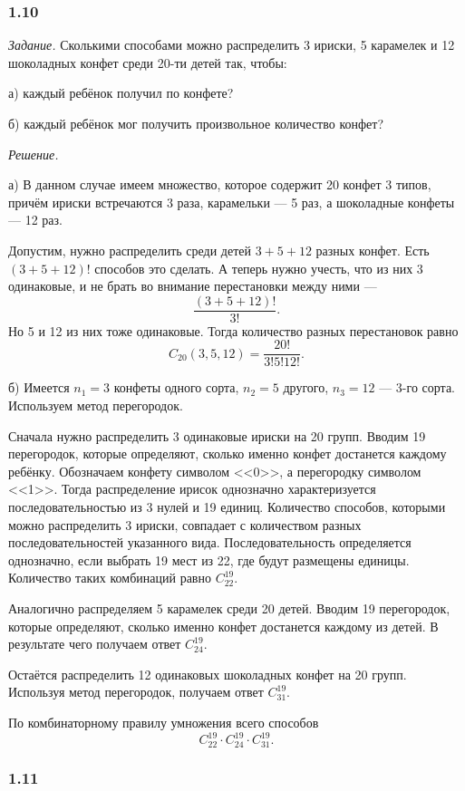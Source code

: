 \documentclass{book}
\begin{document}
\subsubsection*{1.10}

\textit{Задание.} Сколькими способами можно распределить 3 ириски, 5 карамелек и 12 шоколадных конфет среди 20-ти детей так, чтобы:

а) каждый ребёнок получил по конфете?

б) каждый ребёнок мог получить произвольное количество конфет?

\textit{Решение.}

а) В данном случае имеем множество, которое содержит 20 конфет 3 типов, причём ириски встречаются 3 раза, карамельки --- 5 раз, а шоколадные конфеты --- 12 раз.

Допустим, нужно распределить среди детей $3+5+12$ разных конфет. Есть $\left(3+5+12\right)!$ способов это сделать. А теперь нужно учесть, что из них 3 одинаковые, и не брать во внимание перестановки между ними --- $$\frac{\left(3+5+12\right)!}{3!}.$$ Но 5 и 12 из них тоже одинаковые. Тогда количество разных перестановок равно $$C_{20}\left(3, 5, 12\right)=\frac{20!}{3!5!12!}.$$

б) Имеется $n_1=3$ конфеты одного сорта, $n_2=5$ другого, $n_3=12$ --- 3-го сорта. Используем метод перегородок. 

Сначала нужно распределить 3 одинаковые ириски на 20 групп. Вводим 19 перегородок, которые определяют, сколько именно конфет достанется каждому ребёнку. Обозначаем конфету символом <<0>>, а перегородку символом <<1>>. Тогда распределение ирисок однозначно характеризуется последовательностью из 3 нулей и 19 единиц. Количество способов, которыми можно распределить 3 ириски, совпадает с количеством разных последовательностей указанного вида. Последовательность определяется однозначно, если выбрать 19 мест из 22, где будут размещены единицы. Количество таких комбинаций равно $C_{22}^{19}$.

Аналогично распределяем 5 карамелек среди 20 детей. Вводим 19 перегородок, которые определяют, сколько именно конфет достанется каждому из детей. В результате чего получаем ответ $C_{24}^{19}$.

Остаётся распределить 12 одинаковых шоколадных конфет на 20 групп. Используя метод перегородок, получаем ответ $C_{31}^{19}$.

По комбинаторному правилу умножения всего способов $$C_{22}^{19}\cdot C_{24}^{19}\cdot C_{31}^{19}.$$

\subsubsection*{1.11}
\end{document}
